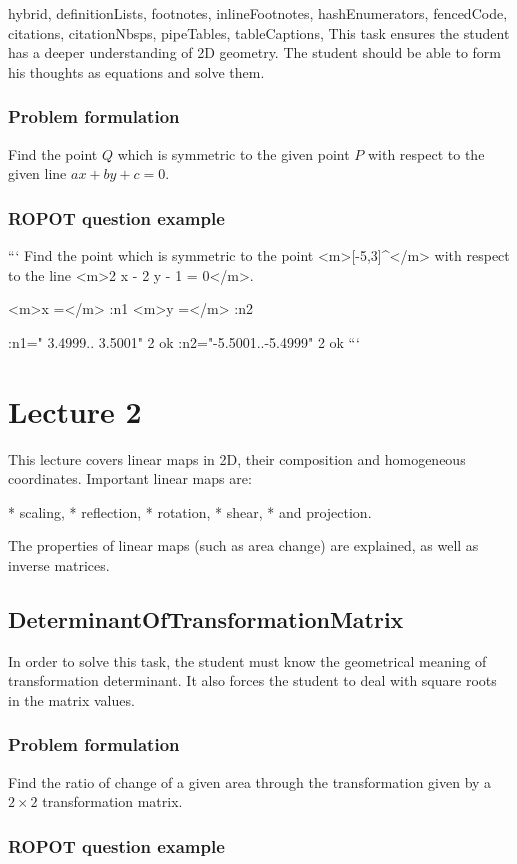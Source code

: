 \begin{markdown*}{%
  hybrid,
  definitionLists,
  footnotes,
  inlineFootnotes,
  hashEnumerators,
  fencedCode,
  citations,
  citationNbsps,
  pipeTables,
  tableCaptions,
}
This task ensures the student has a deeper understanding of 2D geometry. The student should be able to form his thoughts as equations and solve them. 

\subsubsection{Problem formulation}
Find the point $Q$ which is symmetric to the given point $P$ with respect to the given line $ax + by + c = 0$.

\subsubsection{ROPOT question example}

```
Find the point which is symmetric to the point 
<m>[-5,3]^\top</m> with respect to the line 
<m>2 x - 2 y - 1 = 0</m>.

<m>x =</m> :n1
<m>y =</m> :n2

:n1=" 3.4999.. 3.5001" 2 ok
:n2="-5.5001..-5.4999" 2 ok 
```

\section{Lecture 2}

This lecture covers linear maps in 2D, their composition and homogeneous coordinates. 
Important linear maps are:

* scaling,
* reflection,
* rotation,
* shear,
* and projection.

The properties of linear maps (such as area change) are explained, as well as inverse matrices. 

\subsection{DeterminantOfTransformationMatrix}

In order to solve this task, the student must know the geometrical meaning of transformation determinant. It also forces the student to deal with square roots in the matrix values.    

\subsubsection{Problem formulation}
Find the ratio of change of a given area through the transformation given by a $2\times2$ transformation matrix.

\subsubsection{ROPOT question example}


\end{markdown*}
